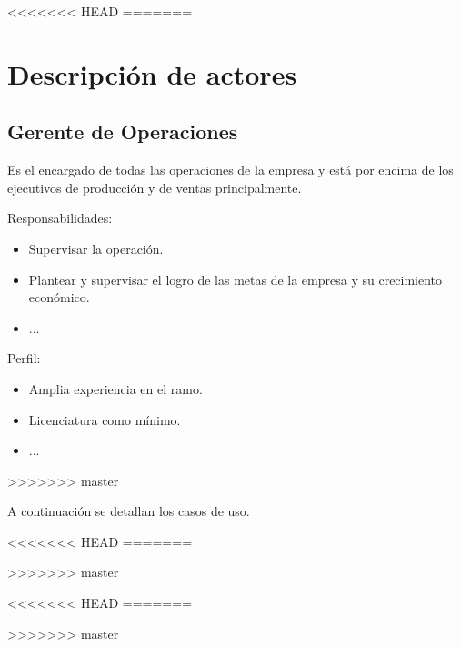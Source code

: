 <<<<<<< HEAD
=======
\section{Descripción de actores}

\begin{Usuario}{\hypertarget{getenteOperaciones}{\subsection{Gerente de Operaciones}}}{
	Es el encargado de todas las operaciones de la empresa y está por encima de los ejecutivos de producción y de ventas principalmente.
}
    \item[Responsabilidades:] \cdtEmpty
    \begin{itemize}
		\item Supervisar la operación.
		\item Plantear y supervisar el logro de las metas de la empresa y su crecimiento económico.
		\item ...
    \end{itemize}

	\item[Perfil:] \cdtEmpty
    \begin{itemize}
		\item Amplia experiencia en el ramo.
		\item Licenciatura como mínimo.
		\item ...
    \end{itemize}
\end{Usuario}
>>>>>>> master

A continuación se detallan los casos de uso.


%
<<<<<<< HEAD
=======

%
>>>>>>> master





<<<<<<< HEAD
=======

>>>>>>> master
